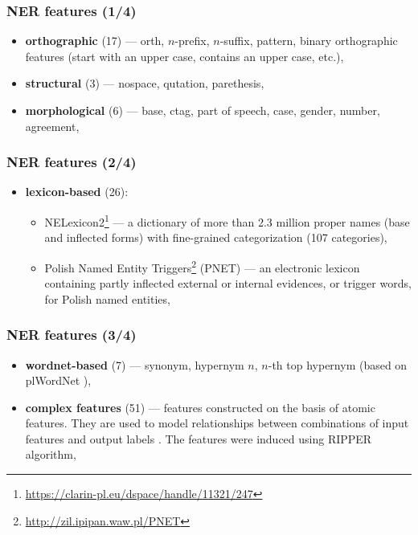 \documentclass[Warsaw]{beamer}
\begin{document}
\begin{frame}
    \frametitle{NER features (1/4)}
    \begin{itemize}
        \item \textbf{orthographic} (17) --- orth, $n$-prefix, $n$-suffix, pattern, binary orthographic features (start with an upper case, contains an upper case, etc.),
        \item \textbf{structural} (3) --- nospace, qutation, parethesis,
        \item \textbf{morphological} (6) --- base, ctag, part of speech, case, gender, number, agreement,
    \end{itemize}
\end{frame}

\begin{frame}
    \frametitle{NER features (2/4)}
        \begin{itemize}
        \item \textbf{lexicon-based} (26):
        \begin{itemize}
            \item NELexicon2\footnote{\url{https://clarin-pl.eu/dspace/handle/11321/247}} --- a dictionary of more than 2.3 million proper names (base and inflected forms) with fine-grained categorization (107 categories),
            \item Polish Named Entity Triggers\footnote{\url{http://zil.ipipan.waw.pl/PNET}} (PNET) --- an electronic lexicon containing partly inflected external or internal evidences, or trigger words, for Polish named entities,
        \end{itemize}
        \end{itemize}
\end{frame}

\begin{frame}
    \frametitle{NER features (3/4)}
        \begin{itemize}
        \item \textbf{wordnet-based} (7) --- synonym, hypernym $n$, $n$-th top hypernym (based on plWordNet \cite{MazPiaRudSzpaKedz:16}),
        \item \textbf{complex features} (51) --- features constructed on the basis of atomic features. They are used to model relationships between combinations of input features and output labels \cite{Marcinczuk2015}. The features were induced using RIPPER algorithm,
    \end{itemize}
\end{frame}
    
\end{document}
